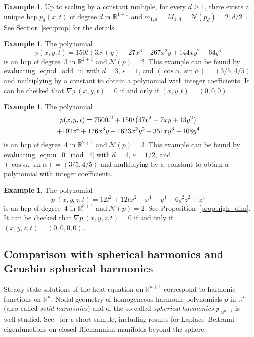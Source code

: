 \documentclass[10pt]{amsart}
\theoremstyle{definition}\newtheorem{defi}[theo]{Definition}\newtheorem{rema}[theo]{Remark}\newtheorem{exam}[theo]{Example}\newtheorem{exem}[theo]{Example}\newtheorem{nota}[theo]{Notation}
\newcommand{\R}{\mathbb{R}}
\newcommand{\sphere}{\mathbb{S}}
\newcommand{\nodal}{\mathcal{N}}
\renewcommand{\epsilon}{\varepsilon}
\let\originalleft\left
\let\originalright\right
\renewcommand{\left}{\mathopen{}\mathclose\bgroup\originalleft}
\renewcommand{\right}{\aftergroup\egroup\originalright}
\begin{document}
\begin{exam}\label{eq:1d}
Up to scaling by a constant multiple, for every $d\geq 1$, there exists a unique hcp $p_d(x,t)$ of degree $d$ in $\R^{1+1}$ and $m_{1,d}=M_{1,d}=\nodal(p_d)=2\lceil d/2\rceil$. See Section~\ref{sec:prop} for the details.
\end{exam}

\begin{exam}\label{eq:n2d3}
The polynomial
\begin{equation}
p(x,y,t)=150t(3x+y)+27x^3+267x^2y+144xy^2-64y^3
\end{equation}
is an hcp of degree~3 in $\R^{2+1}$ and $\nodal(p)=2$. This example can be found by evaluating~\eqref{eqn:d_odd_u} with $d=3$, $\epsilon=1$, and $(\cos\alpha,\sin\alpha)=(3/5,4/5)$ and multiplying by a constant to obtain a polynomial with integer coefficients. It can be checked that $\nabla p~(x,y,t)=0$ if and only if $(x,y,t)=(0,0,0)$.
\end{exam}

\begin{exam}\label{eq:n2d4}
The polynomial
\begin{multline}
p(x,y,t)=7500 t^2 + 150t\left(37x^2-7xy+13y^2\right) \\
+ 192 x^4 + 176 x^3 y + 1623 x^2 y^2 - 351 x y^3 - 108 y^4
\end{multline}
is an hcp of degree~4 in $\R^{2+1}$ and $\nodal(p)=3$. This example can be found by evaluating~\eqref{eqn:u_0_mod_4} with $d=4$, $\epsilon=1/2$, and $(\cos\alpha,\sin\alpha)=(3/5,4/5)$ and multiplying by a~constant to obtain a polynomial with integer coefficients.
\end{exam}

\begin{exam}\label{eq:n3d4}
The polynomial
\begin{equation}
p~(x,y,z,t)=12t^2+12tx^2+x^4+y^4-6y^2z^2+z^4
\end{equation}
is an hcp of degree~4 in $\R^{3+1}$ and $\nodal(p)=2$. See Proposition~\ref{prop:high_dim}. It can be checked that $\nabla p~(x,y,z,t)=0$ if and only if $(x,y,z,t)=(0,0,0,0)$.
\end{exam}

\subsection{Comparison with spherical harmonics and Grushin spherical harmonics}\label{ss:harmonic}

Steady-state solutions of the heat equation on $\R^{n+1}$ correspond to harmonic functions on $\R^n$. Nodal geometry of homogeneous harmonic polynomials $p$ in $\R^n$ (also called \emph{solid harmonics}) and of the so-called \emph{spherical harmonics} $p|_{\sphere^{n-1}}$ is well-studied. See~\cite{EJN07, Logunov-annals1,Logunov-annals2,NS09} for a short sample, including results for Laplace--Beltrami eigenfunctions on closed Riemannian manifolds beyond the sphere.
\end{document}
